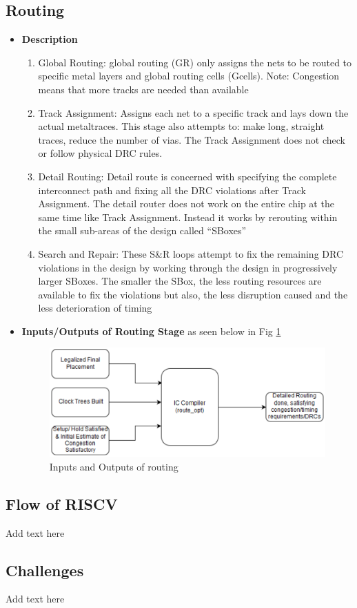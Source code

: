 \documentclass[../main.tex]{subfiles}
\begin{document}
    \subsection{Routing}
     \begin{itemize}
\item \textbf{Description} 
\begin{enumerate}
\item Global Routing: global routing (GR) only assigns the nets to be routed to specific metal layers and global routing cells (Gcells). 
Note: Congestion means that more tracks are needed than available
\item Track Assignment: Assigns each net to a specific track and lays down the actual metaltraces. This stage also attempts to: make long, straight traces, reduce the number of vias. The Track Assignment does not check or follow physical DRC rules.
\item Detail Routing: Detail route is concerned with specifying the complete interconnect path 
and fixing all the DRC violations after Track Assignment. The detail router does not work 
on the entire chip at the same time like Track Assignment. Instead it works by rerouting 
within the small sub-areas of the design called “SBoxes”
\item Search and Repair: These S&R loops attempt to fix the remaining DRC violations in the 
design by working through the design in progressively larger SBoxes. The smaller the 
SBox, the less routing resources are available to fix the violations but also, the less 
disruption caused and the less deterioration of timing
\end{enumerate}



\item \textbf{Inputs/Outputs of Routing Stage} as seen below in Fig \ref{fig:IO_routing}
\begin{figure}[h]
\centering
\includegraphics[width=17cm]{diagrams/IO_routing.PNG}
\caption{ Inputs and Outputs of routing}
\label{fig:IO_routing}
\end{figure}


\end{itemize}
\subsection{ Flow of RISCV}
    Add text here
    \subsection{ Challenges}
    Add text here
   
    
\end{document}
